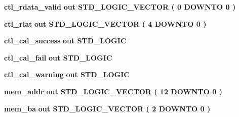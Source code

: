 \begin{DoxyCompactItemize}
\item 
{\bf ctl\+\_\+rdata\+\_\+valid}  {\bfseries {\bfseries \textcolor{keywordflow}{out}\textcolor{vhdlchar}{ }}} {\bfseries \textcolor{comment}{S\+T\+D\+\_\+\+L\+O\+G\+I\+C\+\_\+\+V\+E\+C\+T\+OR}\textcolor{vhdlchar}{ }\textcolor{vhdlchar}{(}\textcolor{vhdlchar}{ }\textcolor{vhdlchar}{ } \textcolor{vhdldigit}{0} \textcolor{vhdlchar}{ }\textcolor{keywordflow}{D\+O\+W\+N\+TO}\textcolor{vhdlchar}{ }\textcolor{vhdlchar}{ } \textcolor{vhdldigit}{0} \textcolor{vhdlchar}{ }\textcolor{vhdlchar}{)}\textcolor{vhdlchar}{ }} 
\item 
{\bf ctl\+\_\+rlat}  {\bfseries {\bfseries \textcolor{keywordflow}{out}\textcolor{vhdlchar}{ }}} {\bfseries \textcolor{comment}{S\+T\+D\+\_\+\+L\+O\+G\+I\+C\+\_\+\+V\+E\+C\+T\+OR}\textcolor{vhdlchar}{ }\textcolor{vhdlchar}{(}\textcolor{vhdlchar}{ }\textcolor{vhdlchar}{ } \textcolor{vhdldigit}{4} \textcolor{vhdlchar}{ }\textcolor{keywordflow}{D\+O\+W\+N\+TO}\textcolor{vhdlchar}{ }\textcolor{vhdlchar}{ } \textcolor{vhdldigit}{0} \textcolor{vhdlchar}{ }\textcolor{vhdlchar}{)}\textcolor{vhdlchar}{ }} 
\item 
{\bf ctl\+\_\+cal\+\_\+success}  {\bfseries {\bfseries \textcolor{keywordflow}{out}\textcolor{vhdlchar}{ }}} {\bfseries \textcolor{comment}{S\+T\+D\+\_\+\+L\+O\+G\+IC}\textcolor{vhdlchar}{ }} 
\item 
{\bf ctl\+\_\+cal\+\_\+fail}  {\bfseries {\bfseries \textcolor{keywordflow}{out}\textcolor{vhdlchar}{ }}} {\bfseries \textcolor{comment}{S\+T\+D\+\_\+\+L\+O\+G\+IC}\textcolor{vhdlchar}{ }} 
\item 
{\bf ctl\+\_\+cal\+\_\+warning}  {\bfseries {\bfseries \textcolor{keywordflow}{out}\textcolor{vhdlchar}{ }}} {\bfseries \textcolor{comment}{S\+T\+D\+\_\+\+L\+O\+G\+IC}\textcolor{vhdlchar}{ }} 
\item 
{\bf mem\+\_\+addr}  {\bfseries {\bfseries \textcolor{keywordflow}{out}\textcolor{vhdlchar}{ }}} {\bfseries \textcolor{comment}{S\+T\+D\+\_\+\+L\+O\+G\+I\+C\+\_\+\+V\+E\+C\+T\+OR}\textcolor{vhdlchar}{ }\textcolor{vhdlchar}{(}\textcolor{vhdlchar}{ }\textcolor{vhdlchar}{ } \textcolor{vhdldigit}{12} \textcolor{vhdlchar}{ }\textcolor{keywordflow}{D\+O\+W\+N\+TO}\textcolor{vhdlchar}{ }\textcolor{vhdlchar}{ } \textcolor{vhdldigit}{0} \textcolor{vhdlchar}{ }\textcolor{vhdlchar}{)}\textcolor{vhdlchar}{ }} 
\item 
{\bf mem\+\_\+ba}  {\bfseries {\bfseries \textcolor{keywordflow}{out}\textcolor{vhdlchar}{ }}} {\bfseries \textcolor{comment}{S\+T\+D\+\_\+\+L\+O\+G\+I\+C\+\_\+\+V\+E\+C\+T\+OR}\textcolor{vhdlchar}{ }\textcolor{vhdlchar}{(}\textcolor{vhdlchar}{ }\textcolor{vhdlchar}{ } \textcolor{vhdldigit}{2} \textcolor{vhdlchar}{ }\textcolor{keywordflow}{D\+O\+W\+N\+TO}\textcolor{vhdlchar}{ }\textcolor{vhdlchar}{ } \textcolor{vhdldigit}{0} \textcolor{vhdlchar}{ }\textcolor{vhdlchar}{)}\textcolor{vhdlchar}{ }} 

\end{DoxyCompactItemize}
